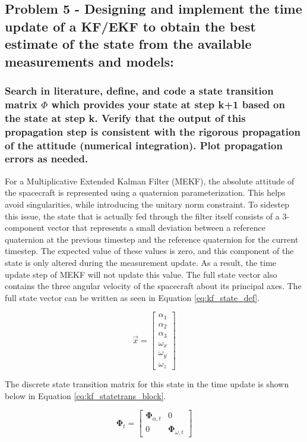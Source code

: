 \subsection{Problem 5 - Designing and implement the time update of a KF/EKF to obtain the best estimate of the state from the available measurements and models:}

\subsubsection{Search in literature, define, and code a state transition matrix $\Phi$ which provides your state at step k+1 based on the state at step k. Verify that the output of this propagation step is consistent with the rigorous propagation of the attitude (numerical integration). Plot propagation errors as needed.}

For a Multiplicative Extended Kalman Filter (MEKF), the absolute attitude of the spacecraft is represented using a quaternion parameterization. This helps avoid singularities, while introducing the unitary norm constraint. To sidestep this issue, the state that is actually fed through the filter itself consists of a 3-component vector that represents a small deviation between a reference quaternion at the previous timestep and the reference quaternion for the current timestep. The expected value of these values is zero, and this component of the state is only altered during the measurement update. As a result, the time update step of MEKF will not update this value. The full state vector also contains the three angular velocity of the spacecraft about its principal axes. The full state vector can be written as seen in Equation \ref{eq:kf_state_def}.

\begin{equation} \label{eq:kf_state_def}
    \vec{x} = \begin{bmatrix}
        \alpha_1 \\ \alpha_2 \\ \alpha_3 \\ \omega_x \\ \omega_y \\ \omega_z
    \end{bmatrix}
\end{equation}

The discrete state transition matrix for this state in the time update is shown below in Equation \ref{eq:kf_statetrans_block}.

\begin{equation} \label{eq:kf_statetrans_block}
    \boldsymbol{\Phi}_t = \begin{bmatrix}
        \boldsymbol{\Phi}_{\alpha,t} & 0 \\
        0 & \boldsymbol{\Phi}_{\omega,t}
    \end{bmatrix}
\end{equation}


